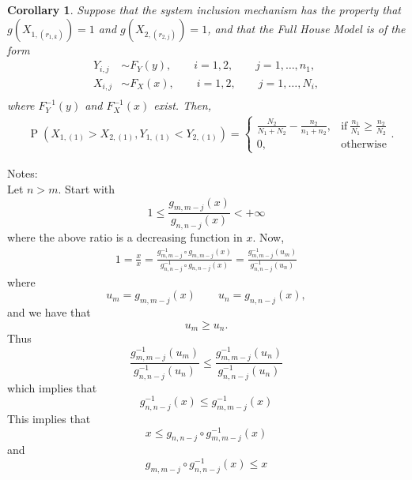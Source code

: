 \documentclass[12pt]{article}
\DeclareMathOperator*{\Prob}{P}
\newtheorem{corollary}{Corollary}[theorem]
\begin{document}

\begin{corollary} \label{corollary:samedistbottom}
Suppose that the system inclusion mechanism has the property that $g(X_{1,(r_{1,k})}) = 1$ and $g(X_{2,(r_{2,j})}) = 1$, and that the Full House Model is of the form 
\begin{align*}
  Y_{i,j} &\sim F_Y(y), \qquad i = 1,2, \qquad j = 1,\ldots,n_1, \\
  X_{i,j} &\sim F_X(x), \qquad i = 1,2, \qquad j = 1,\ldots,N_i, \\
\end{align*}
where $F_Y^{-1}(y)$ and $F_X^{-1}(x)$ exist. Then,
\begin{align*}
	&\Prob\left(X_{1,(1)} > X_{2,(1)}, Y_{1,(1)} < Y_{2,(1)}\right) 
  = \begin{cases}
      \frac{N_2}{N_1 + N_2} - \frac{n_2}{n_1 + n_2}, & \text{if}\ \frac{n_1}{N_1} \geq \frac{n_2}{N_2} \\
      0, & \text{otherwise}
    \end{cases}.
\end{align*}
\end{corollary}


\newpage
Notes: \\

Let $n > m$. Start with 
$$
  1 \leq \frac{g_{m,m-j}(x)}{g_{n,n-j}(x)} < +\infty
$$
where the above ratio is a decreasing function in $x$. Now,
\begin{align*}
	1 = \frac{x}{x} = \frac{g_{m,m-j}^{-1} \circ g_{m,m-j}(x)}{g_{n,n-j}^{-1} \circ g_{n,n-j}(x)} 
	= \frac{g_{m,m-j}^{-1}(u_m)}{g_{n,n-j}^{-1}(u_n)}
\end{align*}
where
$$
   u_m = g_{m,m-j}(x) \qquad u_n = g_{n,n-j}(x),
$$
and we have that 
$$
  u_m \geq u_n.
$$
Thus
$$
  \frac{g_{m,m-j}^{-1}(u_m)}{g_{n,n-j}^{-1}(u_n)} \leq \frac{g_{m,m-j}^{-1}(u_n)}{g_{n,n-j}^{-1}(u_n)}
$$
which implies that 
$$
  g_{n,n-j}^{-1}(x) \leq g_{m,m-j}^{-1}(x)
$$
This implies that 
$$
  x \leq g_{n,n-j} \circ g_{m,m-j}^{-1}(x)
$$
and 
$$
  g_{m,m-j} \circ g_{n,n-j}^{-1}(x) \leq x
$$ 
\end{document}
